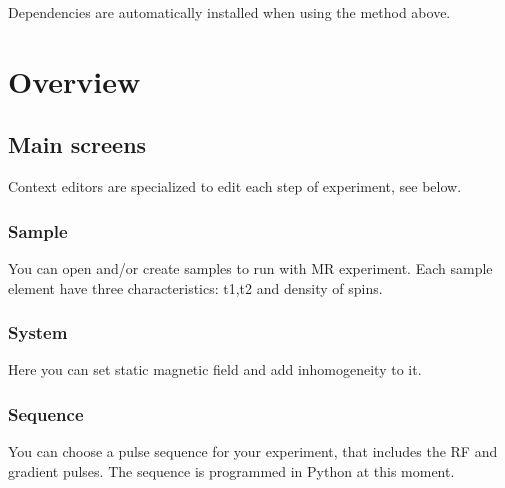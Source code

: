 \documentclass[a4paper,10pt,english]{sphinxmanual}
\begin{document}
Dependencies are automatically installed when using the method above.


\chapter{Overview}
\label{\detokenize{overview:overview}}\label{\detokenize{overview::doc}}

\section{Main screens}
\label{\detokenize{overview:main-screens}}
Context editors are specialized to edit each step of experiment, see below.



\subsection{Sample}
\label{\detokenize{overview:sample}}
You can open and/or create samples to run with MR experiment. Each sample
element have three characteristics: t1,t2 and density of spins.



\subsection{System}
\label{\detokenize{overview:system}}
Here you can set static magnetic field and add inhomogeneity to it.



\subsection{Sequence}
\label{\detokenize{overview:sequence}}
You can choose a pulse sequence for your experiment, that includes the RF
and gradient pulses. The sequence is programmed in Python at this moment.

\end{document}
